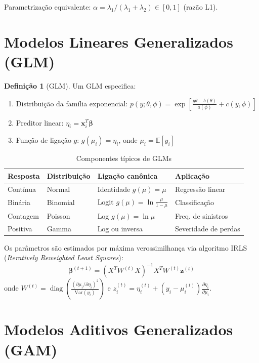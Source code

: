 \documentclass[12pt,a4paper,twoside]{book}
\theoremstyle{definition}
\newtheorem{definicao}{Definição}[chapter]
\theoremstyle{remark}
\newcommand{\E}{\mathbb{E}}
\newcommand{\Var}{\mathrm{Var}}
\newcommand{\bx}{\bm{x}}
\newcommand{\bbeta}{\bm{\beta}}
\DeclareMathOperator{\diag}{diag}
\begin{document}
Parametrização equivalente: $\alpha = \lambda_1/(\lambda_1 + \lambda_2) \in [0,1]$ (razão L1).

\section{Modelos Lineares Generalizados (GLM)}

\begin{definicao}[GLM]
Um GLM especifica:
\begin{enumerate}
  \item Distribuição da família exponencial: $p(y;\theta,\phi) = \exp\!\left[\frac{y\theta - b(\theta)}{a(\phi)} + c(y,\phi)\right]$
  \item Preditor linear: $\eta_i = \bx_i^T\bbeta$
  \item Função de ligação $g$: $g(\mu_i) = \eta_i$, onde $\mu_i = \E[y_i]$
\end{enumerate}
\end{definicao}

\begin{table}[H]
\centering
\caption{Componentes típicos de GLMs}
\begin{tabular}{llll}
\toprule
\textbf{Resposta} & \textbf{Distribuição} & \textbf{Ligação canônica} & \textbf{Aplicação} \\
\midrule
Contínua & Normal & Identidade $g(\mu)=\mu$ & Regressão linear \\
Binária & Binomial & Logit $g(\mu)=\ln\frac{\mu}{1-\mu}$ & Classificação \\
Contagem & Poisson & Log $g(\mu)=\ln\mu$ & Freq. de sinistros \\
Positiva & Gamma & Log ou inversa & Severidade de perdas \\
\bottomrule
\end{tabular}
\end{table}

Os parâmetros são estimados por máxima verossimilhança via algoritmo IRLS (\textit{Iteratively Reweighted Least Squares}):
\[
\bbeta^{(t+1)} = (X^T W^{(t)} X)^{-1} X^T W^{(t)} \bm{z}^{(t)}
\]
onde $W^{(t)} = \diag\!\left(\frac{(\partial\mu_i/\partial\eta_i)^2}{\Var(y_i)}\right)$ e $z_i^{(t)} = \eta_i^{(t)} + (y_i - \mu_i^{(t)})\frac{\partial\eta_i}{\partial\mu_i}$.

\section{Modelos Aditivos Generalizados (GAM)}
\end{document}
